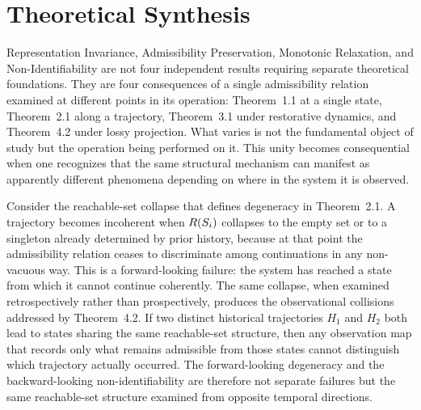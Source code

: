 \chapter{Theoretical Synthesis}
\label{ch:essay-synthesis}

Representation Invariance, Admissibility Preservation, Monotonic Relaxation, and Non-Identifiability are not four independent results requiring separate theoretical foundations. They are four consequences of a single admissibility relation examined at different points in its operation: Theorem~1.1 at a single state, Theorem~2.1 along a trajectory, Theorem~3.1 under restorative dynamics, and Theorem~4.2 under lossy projection. What varies is not the fundamental object of study but the operation being performed on it. This unity becomes consequential when one recognizes that the same structural mechanism can manifest as apparently different phenomena depending on where in the system it is observed.

Consider the reachable-set collapse that defines degeneracy in Theorem~2.1. A trajectory becomes incoherent when $R(S_i)$ collapses to the empty set or to a singleton already determined by prior history, because at that point the admissibility relation ceases to discriminate among continuations in any non-vacuous way. This is a forward-looking failure: the system has reached a state from which it cannot continue coherently. The same collapse, when examined retrospectively rather than prospectively, produces the observational collisions addressed by Theorem~4.2. If two distinct historical trajectories $H_1$ and $H_2$ both lead to states sharing the same reachable-set structure, then any observation map that records only what remains admissible from those states cannot distinguish which trajectory actually occurred. The forward-looking degeneracy and the backward-looking non-identifiability are therefore not separate failures but the same reachable-set structure examined from opposite temporal directions.

